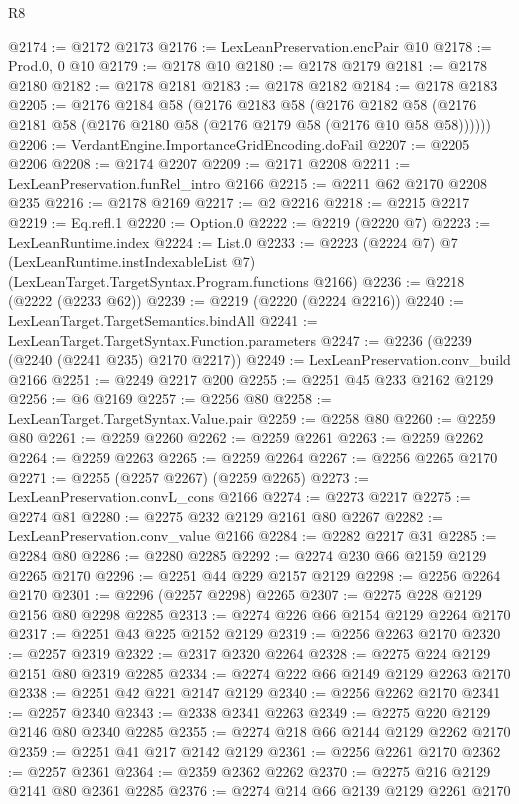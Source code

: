 \begin{lexlean}{R8}
\begin{coremodule}
@2174 := @2172 @2173
@2176 := LexLeanPreservation.encPair @10
@2178 := Prod.{0, 0} @10
@2179 := @2178 @10
@2180 := @2178 @2179
@2181 := @2178 @2180
@2182 := @2178 @2181
@2183 := @2178 @2182
@2184 := @2178 @2183
@2205 := @2176
    @2184
    @58
    (@2176
      @2183
      @58
      (@2176 @2182 @58 (@2176 @2181 @58 (@2176 @2180 @58 (@2176 @2179 @58 (@2176 @10 @58 @58))))))
@2206 := VerdantEngine.ImportanceGridEncoding.doFail
@2207 := @2205 @2206
@2208 := @2174 @2207
@2209 := @2171 @2208
@2211 := LexLeanPreservation.funRel_intro @2166
@2215 := @2211 @62 @2170 @2208 @235
@2216 := @2178 @2169
@2217 := @2 @2216
@2218 := @2215 @2217
@2219 := Eq.refl.{1}
@2220 := Option.{0}
@2222 := @2219 (@2220 @7)
@2223 := LexLeanRuntime.index
@2224 := List.{0}
@2233 := @2223
    (@2224 @7)
    @7
    (LexLeanRuntime.instIndexableList @7)
    (LexLeanTarget.TargetSyntax.Program.functions @2166)
@2236 := @2218 (@2222 (@2233 @62))
@2239 := @2219 (@2220 (@2224 @2216))
@2240 := LexLeanTarget.TargetSemantics.bindAll
@2241 := LexLeanTarget.TargetSyntax.Function.parameters
@2247 := @2236 (@2239 (@2240 (@2241 @235) @2170 @2217))
@2249 := LexLeanPreservation.conv_build @2166
@2251 := @2249 @2217 @200
@2255 := @2251 @45 @233 @2162 @2129
@2256 := @6 @2169
@2257 := @2256 @80
@2258 := LexLeanTarget.TargetSyntax.Value.pair
@2259 := @2258 @80
@2260 := @2259 @80
@2261 := @2259 @2260
@2262 := @2259 @2261
@2263 := @2259 @2262
@2264 := @2259 @2263
@2265 := @2259 @2264
@2267 := @2256 @2265 @2170
@2271 := @2255 (@2257 @2267) (@2259 @2265)
@2273 := LexLeanPreservation.convL_cons @2166
@2274 := @2273 @2217
@2275 := @2274 @81
@2280 := @2275 @232 @2129 @2161 @80 @2267
@2282 := LexLeanPreservation.conv_value @2166
@2284 := @2282 @2217 @31
@2285 := @2284 @80
@2286 := @2280 @2285
@2292 := @2274 @230 @66 @2159 @2129 @2265 @2170
@2296 := @2251 @44 @229 @2157 @2129
@2298 := @2256 @2264 @2170
@2301 := @2296 (@2257 @2298) @2265
@2307 := @2275 @228 @2129 @2156 @80 @2298 @2285
@2313 := @2274 @226 @66 @2154 @2129 @2264 @2170
@2317 := @2251 @43 @225 @2152 @2129
@2319 := @2256 @2263 @2170
@2320 := @2257 @2319
@2322 := @2317 @2320 @2264
@2328 := @2275 @224 @2129 @2151 @80 @2319 @2285
@2334 := @2274 @222 @66 @2149 @2129 @2263 @2170
@2338 := @2251 @42 @221 @2147 @2129
@2340 := @2256 @2262 @2170
@2341 := @2257 @2340
@2343 := @2338 @2341 @2263
@2349 := @2275 @220 @2129 @2146 @80 @2340 @2285
@2355 := @2274 @218 @66 @2144 @2129 @2262 @2170
@2359 := @2251 @41 @217 @2142 @2129
@2361 := @2256 @2261 @2170
@2362 := @2257 @2361
@2364 := @2359 @2362 @2262
@2370 := @2275 @216 @2129 @2141 @80 @2361 @2285
@2376 := @2274 @214 @66 @2139 @2129 @2261 @2170

\end{coremodule}
\end{lexlean}
